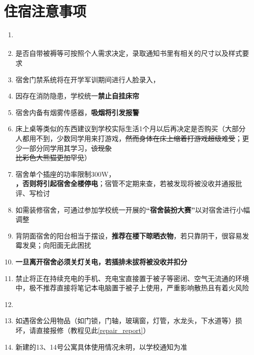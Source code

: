 \section[住宿注意事项]{住宿注意事项}
\begin{enumerate}
    \item \textbf{}
    \item 是否自带被褥等可按照个人需求决定，录取通知书里有相关的尺寸以及样式要求\footnotemark
    \item 宿舍门禁系统将在开学军训期间进行人脸录入，\textbf{}
    \item 因存在消防隐患，学校统一\textbf{禁止自挂床帘}
    \item 宿舍内备有烟雾传感器，\textbf{吸烟将引发报警}
    \item 床上桌等类似的东西建议到学校实际生活1个月以后再决定是否购买（大部分人都用不到，少数同学用来打游戏，\sout{然而身体在床上缩着打游戏超级难受}；更少一部分同学用其学习，\sout{该现象\\比彩色大熊猫更加罕见}）
    \item 宿舍单个插座的功率限制300W\footnotemark，\textbf{}\\\textbf{，否则将引起宿舍全楼停电}；宿管不定期来查，若被发现将被没收并通报批评、写检讨
    \item 如需装修宿舍，可通过参加学校统一开展的\textbf{“宿舍装扮大赛”}\footnotemark 以对宿舍进行小幅调整
    \item 背阴面宿舍的阳台相当于摆设，\textbf{推荐在楼下晾晒衣物}，若只靠阴干，很容易发霉发臭；向阳面无此困扰
    \item \textbf{一旦离开宿舍必须关灯关电，若插排未拔将被没收并扣分}
    \item 禁止将正在持续充电的手机、充电宝直接置于被子等密闭、空气无流通的环境中，极不推荐直接将笔记本电脑置于被子上使用，严重影响散热且有着火风险
    \item \textbf{}\\
    \item 如遇宿舍公用物品（如门锁，门轴，玻璃窗，灯管，水龙头，下水道等）损坏，请直接报修（教程见此\uline{\ref{repair_report}}）
    \item 新建的13、14号公寓具体使用情况未明，以学校通知为准
\end{enumerate}

